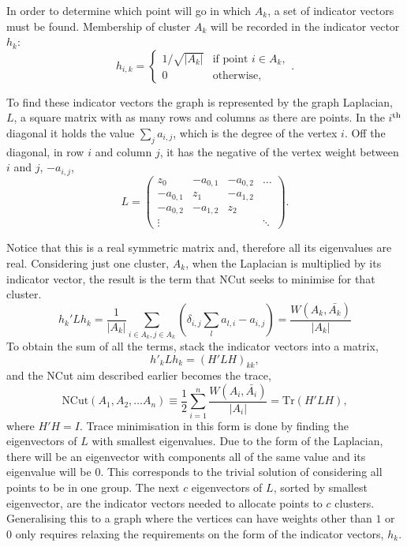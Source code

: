 In order to determine which point will go in which \(A_k\), a set of indicator vectors must be found.
Membership of cluster \(A_k\) will be recorded in the indicator vector \(h_k\):
\begin{equation}
    h_{i, k}= 
    \begin{cases}
        1/\sqrt{|A_k|}& \text{if point } i \in A_k ,\\
        0             & \text{otherwise},
    \end{cases}
    .
\end{equation}

To find these indicator vectors the graph is represented by the graph Laplacian, $L$, a square
matrix with as many rows and columns as there are points.
In the \(i\)$^{\rm th}$ diagonal it holds the value \(\sum_j a_{i, j}\),
which is the degree of the vertex \(i\).
Off the diagonal, in row \(i\) and column \(j\), it has the negative of the vertex weight between \(i\) and \(j\), \(-a_{i, j}\),
\begin{equation}\label{eqn:unnormed_laplacian}
    L = 
    \begin{pmatrix}
        z_0 & -a_{0,1} & -a_{0,2} & \hdots \\
        -a_{0,1} & z_1 & -a_{1,2} & \\
        -a_{0,2} & -a_{1,2} & z_2 & \\
        \vdots   &          &     & \ddots 
    \end{pmatrix}.
\end{equation}

Notice that this is a real symmetric matrix
and, therefore all its eigenvalues are real.
Considering just one cluster, \(A_k\), when the Laplacian is multiplied by its indicator vector,
the result is the term that NCut seeks to minimise for that cluster.
\begin{equation}
    h_k'Lh_k = \frac{1}{|A_k|}\sum_{i \in A_k, j \in A_k} \left(\delta_{i, j}\sum_{l} a_{l, i} - a_{i, j} \right) = \frac{W(A_k, \bar{A_k})}{|A_k|}
\end{equation}
To obtain the sum of all the terms, stack the indicator vectors into a matrix,
\begin{equation} h'_k L h_k = (H'L H)_{kk},\end{equation}
and the NCut aim described earlier becomes the trace,
\begin{equation} \text{NCut}(A_1,A_2, \dots A_n) \equiv \frac{1}{2} \sum_{i=1}^n \frac{W(A_i, \bar{A_i})}{|A_i|} = \text{Tr}(H'LH),\end{equation}
where \(H'H = I\).
Trace minimisation in this form is done
by finding the eigenvectors of \(L\) with smallest 
eigenvalues.
Due to the form of the Laplacian, there will be an eigenvector with components all of the same value and its eigenvalue will be \(0\).
This corresponds to the trivial solution of considering all points to be in one group.
The next \(c\) eigenvectors of \(L\), sorted by smallest eigenvector, are the indicator vectors needed to allocate points to \(c\) clusters.
Generalising this to a graph where the vertices can have weights other than \(1\) or \(0\)
only requires relaxing the requirements on the form of the indicator vectors, \(h_k\).

